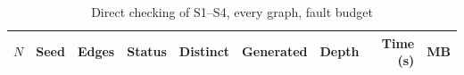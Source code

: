 \documentclass[journal]{IEEEtran}
\begin{document}
\begin{table}[h]
\caption{Direct checking of S1--S4, every graph, fault budget \ScaleFaultBudget}
\label{tab:runs}
\centering
\scriptsize
\setlength{\tabcolsep}{2pt}
\begin{tabular}{@{}rrrlrrrrr@{}}
\toprule
$N$ & Seed & Edges & Status & Distinct & Generated & Depth & Time (s) & MB \\
\midrule

\end{tabular}
\end{table}



\end{document}
